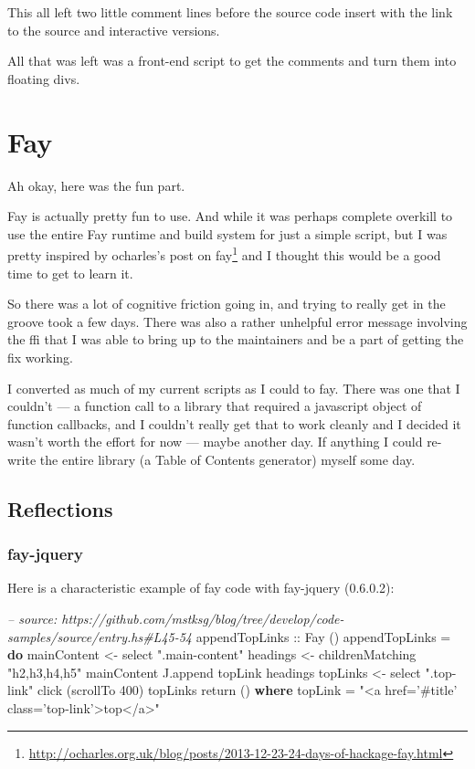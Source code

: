 \documentclass[]{article}
\newenvironment{Shaded}{}{}
\newcommand{\KeywordTok}[1]{\textcolor[rgb]{0.00,0.44,0.13}{\textbf{{#1}}}}
\newcommand{\DataTypeTok}[1]{\textcolor[rgb]{0.56,0.13,0.00}{{#1}}}
\newcommand{\DecValTok}[1]{\textcolor[rgb]{0.25,0.63,0.44}{{#1}}}
\newcommand{\StringTok}[1]{\textcolor[rgb]{0.25,0.44,0.63}{{#1}}}
\newcommand{\CommentTok}[1]{\textcolor[rgb]{0.38,0.63,0.69}{\textit{{#1}}}}
\newcommand{\OtherTok}[1]{\textcolor[rgb]{0.00,0.44,0.13}{{#1}}}
\newcommand{\FunctionTok}[1]{\textcolor[rgb]{0.02,0.16,0.49}{{#1}}}
\newcommand{\NormalTok}[1]{{#1}}
\renewcommand{\href}[2]{#2\footnote{\url{#1}}}
\begin{document}
This all left two little comment lines before the source code insert with the link to the source and
interactive versions.

All that was left was a front-end script to get the comments and turn them into floating divs.

\section{Fay}\label{fay}

Ah okay, here was the fun part.

Fay is actually pretty fun to use. And while it was perhaps complete overkill to use the entire Fay
runtime and build system for just a simple script, but I was pretty inspired by
\href{http://ocharles.org.uk/blog/posts/2013-12-23-24-days-of-hackage-fay.html}{ocharles's post on
fay} and I thought this would be a good time to get to learn it.

So there was a lot of cognitive friction going in, and trying to really get in the groove took a few
days. There was also a rather unhelpful error message involving the ffi that I was able to bring up
to the maintainers and be a part of getting the fix working.

I converted as much of my current scripts as I could to fay. There was one that I couldn't --- a
function call to a library that required a javascript object of function callbacks, and I couldn't
really get that to work cleanly and I decided it wasn't worth the effort for now --- maybe another
day. If anything I could re-write the entire library (a Table of Contents generator) myself some
day.

\subsection{Reflections}\label{reflections-1}

\subsubsection{fay-jquery}\label{fay-jquery}

Here is a characteristic example of fay code with fay-jquery (0.6.0.2):

\begin{Shaded}
\begin{Highlighting}[]
\CommentTok{-- source: https://github.com/mstksg/blog/tree/develop/code-samples/source/entry.hs#L45-54}
\OtherTok{appendTopLinks ::} \DataTypeTok{Fay} \NormalTok{()}
\NormalTok{appendTopLinks }\FunctionTok{=} \KeywordTok{do}
  \NormalTok{mainContent }\OtherTok{<-} \NormalTok{select }\StringTok{".main-content"}
  \NormalTok{headings }\OtherTok{<-} \NormalTok{childrenMatching }\StringTok{"h2,h3,h4,h5"} \NormalTok{mainContent}
  \NormalTok{J.append topLink headings}
  \NormalTok{topLinks }\OtherTok{<-} \NormalTok{select }\StringTok{".top-link"}
  \NormalTok{click (scrollTo }\DecValTok{400}\NormalTok{) topLinks}
  \NormalTok{return ()}
  \KeywordTok{where}
    \NormalTok{topLink }\FunctionTok{=} \StringTok{"<a href='#title' class='top-link'>top</a>"}
\end{Highlighting}
\end{Shaded}
\end{document}
